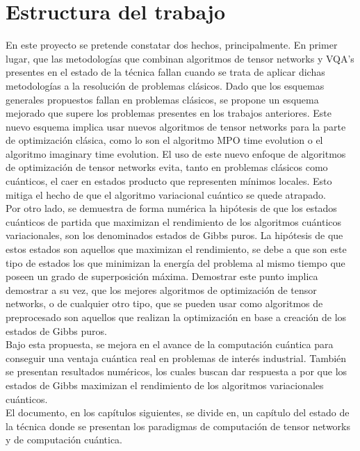 \newpage

\section{Estructura del trabajo}

En este proyecto se pretende constatar dos hechos, principalmente. En primer lugar, que las metodologías que combinan algoritmos de tensor networks y VQA's presentes en el estado de la técnica fallan cuando se trata de aplicar dichas metodologías a la resolución de problemas clásicos. Dado que los esquemas generales propuestos fallan en problemas clásicos, se propone un esquema mejorado que supere los problemas presentes en los trabajos anteriores. Este nuevo esquema implica usar nuevos algoritmos de tensor networks para la parte de optimización clásica, como lo son el algoritmo MPO time evolution o el algoritmo imaginary time evolution. El uso de este nuevo enfoque de algoritmos de optimización de tensor networks evita, tanto en problemas clásicos como cuánticos, el caer en estados producto que representen mínimos locales. Esto mitiga el hecho de que el algoritmo variacional cuántico se quede atrapado. \\

Por otro lado, se demuestra de forma numérica la hipótesis de que los estados cuánticos de partida que maximizan el rendimiento de los algoritmos cuánticos variacionales, son los denominados estados de Gibbs puros. La hipótesis de que estos estados son aquellos que maximizan el rendimiento, se debe a que son este tipo de estados los que minimizan la energía del problema al mismo tiempo que poseen un grado de superposición máxima. Demostrar este punto implica demostrar a su vez, que los mejores algoritmos de optimización de tensor networks, o de cualquier otro tipo, que se pueden usar como algoritmos de preprocesado son aquellos que realizan la optimización en base a creación de los estados de Gibbs puros. \\

Bajo esta propuesta, se mejora en el avance de la computación cuántica para conseguir una ventaja cuántica real en problemas de interés industrial. También se presentan resultados numéricos, los cuales buscan dar respuesta a por que los estados de Gibbs maximizan el rendimiento de los algoritmos variacionales cuánticos. \\

El documento, en los capítulos siguientes, se divide en, un capítulo del estado de la técnica donde se presentan los paradigmas de computación de tensor networks y de computación cuántica. \\

